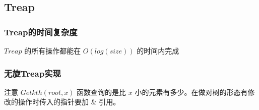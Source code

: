 \documentclass[11pt]{article}
\begin{document}
\subsection{Treap}
\label{sec-4-4}

\subsubsection{Treap的时间复杂度}
\label{sec-4-4-1}

$Treap$ 的所有操作都能在 $O(log(size))$ 的时间内完成

\subsubsection{无旋Treap实现}
\label{sec-4-4-2}

注意 $Getkth(root,x)$ 函数查询的是比 $x$ 小的元素有多少。在做对树的形态有修改的操作时传入的指针要加 \& 引用。
\end{document}
